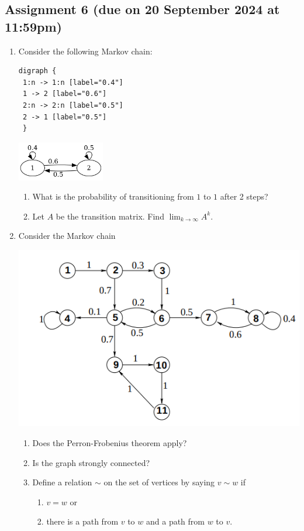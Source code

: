 \documentclass{amsart}
\begin{document}
\subsection{Assignment 6 (due on 20 September 2024 at 11:59pm)}
\label{sec:org2c1d4a2}
\togglefalse{solutions}
\begin{enumerate}
\item Consider the following Markov chain:
\begin{verbatim}
digraph {
 1:n -> 1:n [label="0.4"]
 1 -> 2 [label="0.6"]
 2:n -> 2:n [label="0.5"]
 2 -> 1 [label="0.5"]   
 }
\end{verbatim}
\begin{center}
\includegraphics[width=0.3\textwidth]{6a.png}
\label{org119eca1}
\end{center}

\begin{enumerate}
\item What is the probability of transitioning from \(1\) to \(1\) after 2 steps?

\item Let \(A\) be the transition matrix.
Find \(\lim_{k \to\infty} A^k\).
\end{enumerate}

\item Consider the Markov chain
\begin{center}
\includegraphics[width=.5 \textwidth]{assets/Assignments/2024-09-03_12-42-11_screenshot.png}
\end{center}

\begin{enumerate}
\item Does the Perron-Frobenius theorem apply?

\item Is the graph strongly connected?

\item Define a relation \(\sim\) on the set of vertices by saying \(v \sim w\) if
\begin{enumerate}
\item \(v = w\) or
\item there is a path from \(v\) to \(w\) and a path from \(w\) to \(v\).
\end{enumerate}


\end{enumerate}
\end{enumerate}
\end{document}
